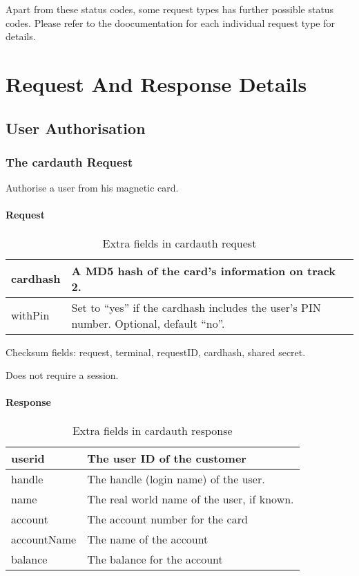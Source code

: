\documentclass[a4paper,11pt]{article}
\newcommand{\code}[1]
   {\textsf{\mbox{#1}}}
\newcommand{\rightcellwidth}{25em}
\newcommand{\reqsection}[1]
    {\subsubsection{The \code{#1} Request}}
\newcommand{\partsection}[1]
           {\paragraph{#1}}
\begin{document}
Apart from these status codes, some request types has further possible
status codes. Please refer to the doocumentation for each individual
request type for details. 

\clearpage

\section{Request And Response Details}\label{sec:requestDetails} 


\subsection{User Authorisation}

\reqsection{cardauth}

Authorise a user from his magnetic card.

\partsection{Request}
\begin{table}[!hb]
  \begin{tabular}{|l|p{\rightcellwidth}|}
    \hline
    cardhash & A MD5 hash of the card's information on track 2.\\\hline
    withPin  & Set to ``yes'' if the cardhash includes the user's PIN
               number. Optional, default ``no''. \\\hline
  \end{tabular} 
  \caption{Extra fields in \code{cardauth} request}
\end{table}

Checksum fields: request, terminal, requestID, cardhash, shared secret.

Does not require a session.

\partsection{Response}
\begin{table}[!ht]
  \begin{tabular}{|l|p{\rightcellwidth}|}
    \hline
      userid  & The user ID of the customer \\\hline
      handle  & The handle (login name) of the user.\\\hline
      name    & The real world name of the user, if known.\\\hline
      account & The account number for the card\\\hline
      accountName & The name of the account\\\hline
      balance & The balance for the account\\\hline
  \end{tabular} 
  \caption{Extra fields in \code{cardauth} response}
\end{table}
\end{document}
